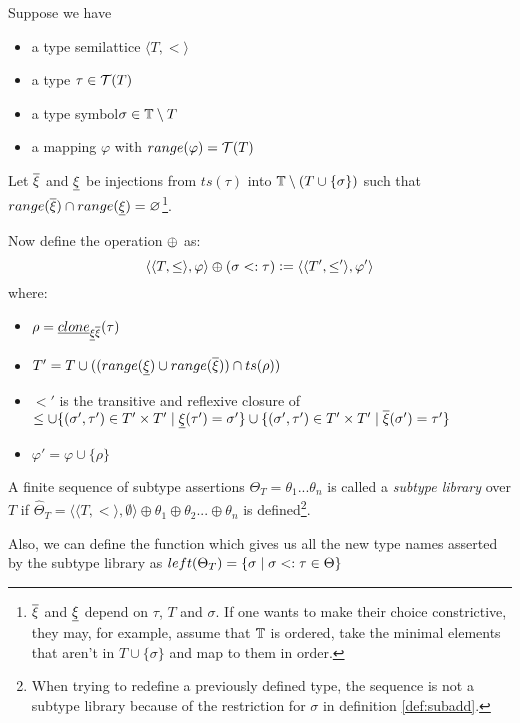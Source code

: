 \documentclass[main.tex]{subfiles}
\begin{document}
\begin{defn}
    \label{def:subadd}
    Suppose we have
    \begin{itemize}
        \item a type semilattice $\langle T, \less \rangle$
        \item a type $\tau \in \mathcal{T}( T )$
        \item a type symbol$\sigma \in \mathbb{T} \setminus T$
        \item a mapping $\varphi$ with $range(\varphi) = \mathcal{T}( T )$
    \end{itemize}
    Let $\overline{\xi}$ and $\underline{\xi}$ be injections from
    $ts(\tau)$ into $\mathbb{T} \setminus (T \cup \{ \sigma \})$ such that
    $range(\overline{\xi}) \cap range(\underline{\xi}) = \varnothing$\footnote{
        $\overline{\xi}$ and $\underline{\xi}$ depend on $\tau$, $T$ and
        $\sigma$. If one wants to make their choice constrictive, they may,
        for example, assume that $\mathbb{T}$ is ordered, take the minimal
        elements that aren't in $T \cup \{ \sigma \}$ and map to them in
        order.
    }.

    Now define the operation $\oplus$ as:
        \[ \langle \langle T, \leq \rangle, \varphi \rangle
            \oplus (\sigma <: \tau)
            \vcentcolon=
            \langle \langle T', \leq' \rangle, \varphi' \rangle
        \] where:
    \begin{itemize}
        \item $\rho = \underline{clone}_{\underline{\xi} \overline{\xi}}(\tau)$
        \item $T' = T \cup ((range(\underline{\xi}) \cup range(\overline{\xi})) \cap ts(\rho))$
        \item $\less'$ is the transitive and reflexive closure of
            $\leq \cup \{ (\sigma', \tau') \in T' \times T' \mid \underline{\xi}(\tau') = \sigma' \}
                   \cup \{ (\sigma', \tau') \in T' \times T' \mid \overline{\xi}(\sigma') = \tau' \}$
        \item $\varphi' = \varphi \cup \{ \rho \}$
    \end{itemize}
\end{defn}

\begin{defn}
    A finite sequence of subtype assertions
    $\Theta_T = \theta_1 ... \theta_n$ is called a \emph{subtype library} over $T$
    if $\hat{\Theta}_T = \langle \langle T, \less \rangle, \emptyset \rangle \oplus \theta_1 \oplus \theta_2 ... \oplus \theta_n$
    is defined\footnote{
        When trying to redefine a previously defined type, the sequence is not
        a subtype library because of the restriction for $\sigma$
        in definition \ref{def:subadd}.
    }.

    Also, we can define the function which gives us all the new type names
    asserted by the subtype library as
    $left(\Theta_T) = \{ \sigma \mid \sigma <: \tau \in \Theta \}$
\end{defn}
\end{document}
